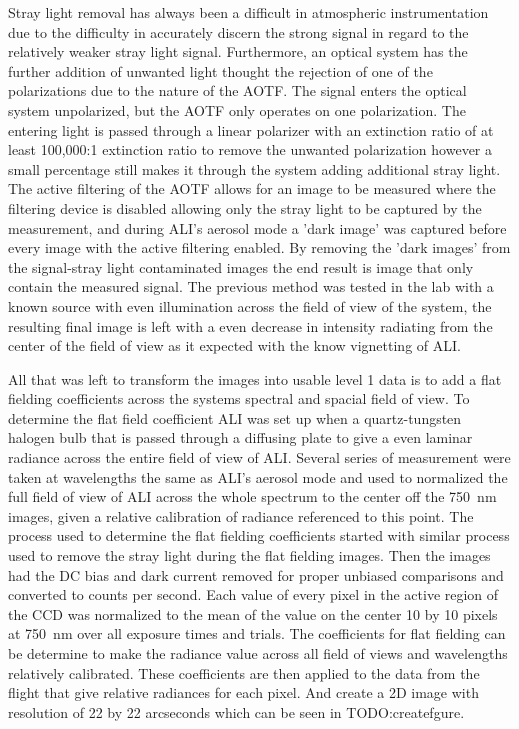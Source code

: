 \documentclass[12pt, draft]{article}
\begin{document}
Stray light removal has always been a difficult in atmospheric instrumentation due to the difficulty in accurately discern the strong signal in regard to the relatively weaker stray light signal. Furthermore, an optical system has the further addition of unwanted light thought the rejection of one of the polarizations due to the nature of the AOTF. The signal enters the optical system unpolarized, but the AOTF only operates on one polarization. The entering light is passed through a linear polarizer with an extinction ratio of at least 100,000:1 extinction ratio to remove the unwanted polarization however a small percentage still makes it through the system adding additional stray light. The active filtering of the AOTF allows for an image to be measured where the filtering device is disabled allowing only the stray light to be captured by the measurement, and during ALI's aerosol mode a 'dark image' was captured before every image with the active filtering enabled. By removing the 'dark images' from the signal-stray light contaminated images the end result is image that only contain the measured signal. The previous method was tested in the lab with a known source with even illumination across the field of view of the system, the resulting final image is left with a even decrease in intensity radiating from the center of the field of view as it expected with the know vignetting of ALI.

All that was left to transform the images into usable level 1 data is to add a flat fielding coefficients across the systems spectral and spacial field of view. To determine the flat field coefficient ALI was set up when a quartz-tungsten halogen bulb that is passed through a diffusing plate to give a even laminar radiance across the entire field of view of ALI. Several series of measurement were taken at wavelengths the same as ALI's aerosol mode and used to normalized the full field of view of ALI across the whole spectrum to the center off the 750~nm images, given a relative calibration of radiance referenced to this point. The process used to determine the flat fielding coefficients started with similar process used to remove the stray light during the flat fielding images. Then the images had the DC bias and dark current removed for proper unbiased comparisons and converted to counts per second. Each value of every pixel in the active region of the CCD was normalized to the mean of the value on the center 10 by 10 pixels at 750~nm over all exposure times and trials. The coefficients for flat fielding can be determine to make the radiance value across all field of views and wavelengths relatively calibrated. These coefficients are then applied to the data from the flight that give relative radiances for each pixel. And create a 2D image with resolution of 22 by 22 arcseconds which can be seen in TODO:createfgure.
\end{document}
